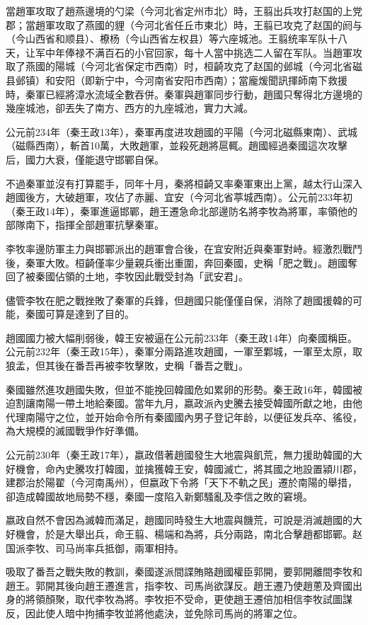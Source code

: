 當趙軍攻取了趙燕邊境的勺梁（今河北省定州市北）時，王翦出兵攻打赵国的上党郡；當趙軍攻取了燕國的貍（今河北省任丘市東北）時，王翦已攻克了赵国的阏与（今山西省和顺县）、橑杨（今山西省左权县）等六座城池。王翦统率军队十八天，让军中年俸禄不满百石的小官回家，每十人當中挑选二人留在军队。当趙軍攻取了燕國的陽城（今河北省保定市西南）时，桓齮攻克了赵国的邺城（今河北省磁县邺镇）和安阳（即新宁中，今河南省安阳市西南）；當龐煖聞訊揮師南下救援時，秦軍已經將漳水流域全數吞併。秦軍與趙軍同步行動，趙國只奪得北方邊境的幾座城池，卻丟失了南方、西方的九座城池，實力大減。

公元前234年（秦王政13年），秦軍再度进攻趙國的平陽（今河北磁縣東南）、武城（磁縣西南），斬首10萬，大敗趙軍，並殺死趙將扈輒。趙國經過秦國這次攻擊后，國力大衰，僅能退守邯鄲自保。

不過秦軍並沒有打算罷手，同年十月，秦將桓齮又率秦軍東出上黨，越太行山深入趙國後方，大破趙軍，攻佔了赤麗、宜安（今河北省葶城西南）。公元前233年初（秦王政14年），秦軍進逼邯鄲，趙王遷急命北部邊防名將李牧為將軍，率領他的部隊南下，指揮全部趙軍抗擊秦軍。

李牧率邊防軍主力與邯鄲派出的趙軍會合後，在宜安附近與秦軍對峙。經激烈戰鬥後，秦軍大敗。桓齮僅率少量親兵衝出重圍，奔回秦國，史稱「肥之戰」。趙國奪回了被秦國佔領的土地，李牧因此戰受封為「武安君」。

儘管李牧在肥之戰挫敗了秦軍的兵鋒，但趙國只能僅僅自保，消除了趙國援韓的可能，秦國可算是達到了目的。

趙國國力被大幅削弱後，韓王安被逼在公元前233年（秦王政14年）向秦國稱臣。公元前232年（秦王政15年），秦軍分兩路進攻趙國，一軍至鄴城，一軍至太原，取狼孟，但其後在番吾再被李牧擊敗，史稱「番吾之戰」。

秦國雖然進攻趙國失敗，但並不能挽回韓國危如累卵的形勢。秦王政16年，韓國被迫割讓南陽一帶土地給秦國。當年九月，嬴政派內史騰去接受韓國所獻之地，由他代理南陽守之位，並开始命令所有秦國國內男子登记年龄，以便征发兵卒、徭役，為大規模的滅國戰爭作好準備。

公元前230年（秦王政17年），嬴政借著趙國發生大地震與飢荒，無力援助韓國的大好機會，命內史騰攻打韓國，並擒獲韓王安，韓國滅亡，將其國之地設置潁川郡，建郡治於陽翟（今河南禹州），但嬴政下令將「天下不軌之民」遷於南陽的舉措，卻造成韓國故地局勢不穩，秦國一度陷入新鄭騷亂及李信之敗的窘境。

嬴政自然不會因為滅韓而滿足，趙國同時發生大地震與饑荒，可說是消滅趙國的大好機會，於是大舉出兵，命王翦、楊端和為將，兵分兩路，南北合擊趙都邯鄲。赵国派李牧、司马尚率兵抵御，兩軍相持。

吸取了番吾之戰失敗的教訓，秦國遂派間諜賄賂趙國權臣郭開，要郭開離間李牧和趙王。郭開其後向趙王遷進言，指李牧、司馬尚欲謀反。趙王遷乃使趙蔥及齊國出身的將領顏聚，取代李牧為將。李牧拒不受命，更使趙王遷倍加相信李牧試圖謀反，因此使人暗中拘捕李牧並將他處決，並免除司馬尚的將軍之位。

